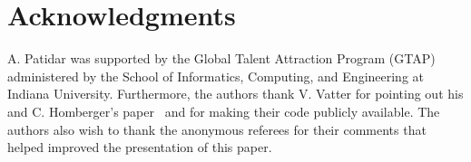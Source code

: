 \documentclass[final]{dmtcs-episciences}
\numberwithin{equation}{section}
\begin{document}
\section{Acknowledgments} 

A. Patidar was supported by the Global Talent Attraction Program (GTAP) administered by the School of Informatics, Computing, and Engineering at Indiana University. Furthermore, the authors thank V. Vatter for pointing out his and C. Homberger's paper~\cite{HV16} and for making their code publicly available. The authors also wish to thank the anonymous referees for their comments that helped improved the presentation of this paper. 












\end{document}
